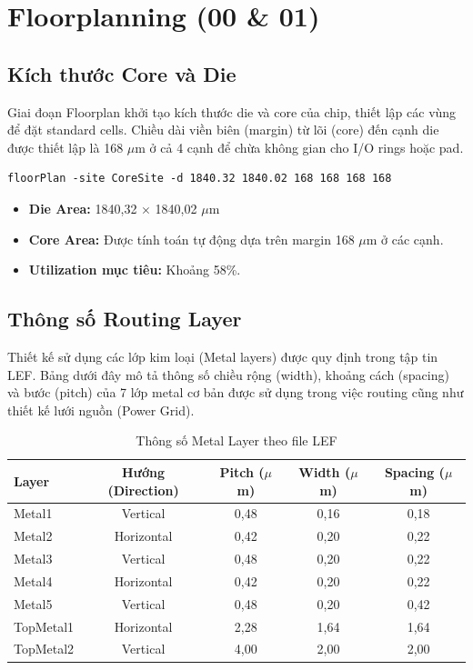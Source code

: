 \documentclass[12pt,a4paper]{article}
\begin{document}
\section{Floorplanning (00 \& 01)}

\subsection{Kích thước Core và Die}
Giai đoạn Floorplan khởi tạo kích thước die và core của chip, thiết lập các vùng để đặt standard cells. Chiều dài viền biên (margin) từ lõi (core) đến cạnh die được thiết lập là 168 $\mu$m ở cả 4 cạnh để chừa không gian cho I/O rings hoặc pad.

\begin{lstlisting}[caption={Khởi tạo Floorplan}]
floorPlan -site CoreSite -d 1840.32 1840.02 168 168 168 168
\end{lstlisting}

\begin{itemize}
    \item \textbf{Die Area:} 1840,32 $\times$ 1840,02 $\mu$m
    \item \textbf{Core Area:} Được tính toán tự động dựa trên margin 168 $\mu$m ở các cạnh.
    \item \textbf{Utilization mục tiêu:} Khoảng 58\%.
\end{itemize}

\subsection{Thông số Routing Layer}
Thiết kế sử dụng các lớp kim loại (Metal layers) được quy định trong tập tin LEF. Bảng dưới đây mô tả thông số chiều rộng (width), khoảng cách (spacing) và bước (pitch) của 7 lớp metal cơ bản được sử dụng trong việc routing cũng như thiết kế lưới nguồn (Power Grid).

\begin{table}[H]
    \centering
    \caption{Thông số Metal Layer theo file LEF}
    \label{tab:metal_rules}
    \begin{tabular}{|l|c|c|c|c|}
        \hline
        \textbf{Layer} & \textbf{Hướng (Direction)} & \textbf{Pitch ($\mu$m)} & \textbf{Width ($\mu$m)} & \textbf{Spacing ($\mu$m)} \\
        \hline
        Metal1 & Vertical & 0,48 & 0,16 & 0,18 \\
        Metal2 & Horizontal & 0,42 & 0,20 & 0,22 \\
        Metal3 & Vertical & 0,48 & 0,20 & 0,22 \\
        Metal4 & Horizontal & 0,42 & 0,20 & 0,22 \\
        Metal5 & Vertical & 0,48 & 0,20 & 0,42 \\
        TopMetal1 & Horizontal & 2,28 & 1,64 & 1,64 \\
        TopMetal2 & Vertical & 4,00 & 2,00 & 2,00 \\
        \hline
    \end{tabular}
\end{table}
\end{document}

